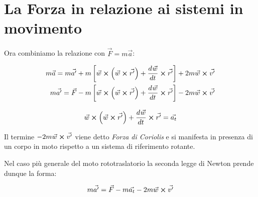 \section{La Forza in relazione ai sistemi in movimento}

Ora combiniamo la relazione  con $ \vec{F} = m \vec{a} $:

\begin{equation}
  \begin{split}
    m \vec{a} = m \vec{a'} +
    m \left[ \vec{w} \crossproduct \left(\vec{w} \crossproduct \vec{r'}\right) + \der{\vec{w}}{t} \crossproduct \vec{r'}\right] +
    2m \vec{w} \crossproduct \vec{v'} \\
    m \vec{a'} = \vec{F} -
    m \left[ \vec{w} \crossproduct \left(\vec{w} \crossproduct \vec{r'}\right) + \der{\vec{w}}{t} \crossproduct \vec{r'}\right]
    - 2m \vec{w} \crossproduct \vec{v'}
  \end{split}
\end{equation}

$$ \vec{w} \crossproduct \left(\vec{w} \crossproduct \vec{r'}\right) + \der{\vec{w}}{t} \crossproduct \vec{r'} = \vec{a_t}$$

Il termine $- 2m \vec{w} \crossproduct \vec{v'}$ viene detto \textit{Forza di Coriolis} e
si manifesta in presenza di un corpo in moto rispetto a un sistema di riferimento rotante.

Nel caso più generale del moto rototraslatorio la seconda legge di Newton prende dunque la forma:

\begin{equation}\label{eq:2nd_newton_law}
  m \vec{a'} = \vec{F} - m \vec{a_t} - 2m \vec{w} \crossproduct \vec{v'}
\end{equation}

